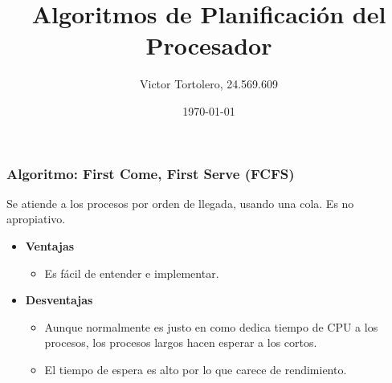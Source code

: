 \documentclass{beamer}
\title{Algoritmos de Planificación del Procesador}
\author{Victor Tortolero, 24.569.609}
\institute{
	Sistemas Operativos, FACYT
}
\date{\today}
\newcommand{\algTitle}{\textbf{Algoritmo}: }
\begin{document}

\begin{frame}
	\titlepage

\end{frame}
\author{}


\begin{frame}
\frametitle{\algTitle First Come, First Serve (FCFS)}
Se atiende a los procesos por orden de llegada, usando una cola. Es no apropiativo.

\begin{itemize}
	\item \textbf{Ventajas}
	\begin{itemize}
		\item Es fácil de entender e implementar.
	\end{itemize}
	\vspace{0.5cm}
	
	\item \textbf{Desventajas}
	\begin{itemize}
		\item Aunque normalmente es justo en como dedica tiempo de CPU a los procesos,
		los procesos largos hacen esperar a los cortos.
		\item El tiempo de espera es alto por lo que carece de rendimiento.
	\end{itemize}
\end{itemize}

\end{frame}
\end{document}
